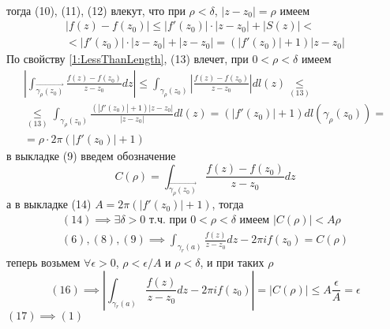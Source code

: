 \documentclass[main]{subfiles}
\begin{document}
\begin{longProof}[теоремы]
\begin{gather*}
    \end{gather*}
    тогда (10), (11), (12) влекут, что при $\rho < \delta$, $|z - z_0| = \rho$ имеем
    \begin{multline*}
        |f(z) - f(z_0)| \le |f'(z_0)| \cdot |z - z_0| + |S(z)| < \\
        < |f'(z_0)| \cdot  |z - z_0| + |z - z_0| = (|f'(z_0)| + 1)|z - z_0| \tag{13}
    \end{multline*}
    По свойству \ref{1:LessThanLength}, (13) влечет, при $0 < \rho < \delta$ имеем
    \begin{multline*}
        \left| \int_{\overrightarrow{\gamma_\rho(z_0)}} \frac{f(z) - f(z_0)}{z - z_0} dz \right| \le \int_{\gamma_\rho(z_0)} \left| \frac{f(z) - f(z_0)}{z - z_0} \right| dl(z) \underset{(13)}{\le} \\
        \underset{(13)}{\le} \int_{\gamma_\rho(z_0)} \frac{(|f'(z_0)| + 1) |z - z_0|}{|z - z_0|} dl(z)  = (|f'(z_0)| + 1) dl(\gamma_\rho(z_0)) =\\
        = \rho \cdot 2 \pi (|f'(z_0)| + 1) \tag{14}
    \end{multline*}
    в выкладке (9) введем обозначение
    \[C (\rho) = \int_{\overrightarrow{\gamma_\rho(z_0)}} \frac{f(z) - f(z_0)}{z - z_0} dz\]
    а в выкладке (14) $A = 2 \pi (|f'(z_0)| + 1)$, тогда
    \begin{gather*}
        (14) \implies \exists \delta > 0 \text{ т.ч. при } 0 < \rho < \delta \text{ имеем } |C(\rho)| < A \rho \tag{15}  \\
        (6), (8), (9) \implies \int_{\gamma_r(a)} \frac{f(z)}{z - z_0} dz - 2 \pi i f(z_0) = C(\rho) \tag{16}
    \end{gather*}
    теперь возьмем $\forall \epsilon > 0$, $\rho < \epsilon / A$ и $\rho < \delta$, и при таких $\rho$
    \[(16) \implies \left| \int_{\gamma_r(a)} \frac{f(z)}{z - z_0} dz - 2 \pi i f(z_0) \right| = |C(\rho)| \le A \frac{\epsilon}{A} = \epsilon \tag{17}\]
    $(17) \implies (1)$
\end{longProof}
\end{document}
